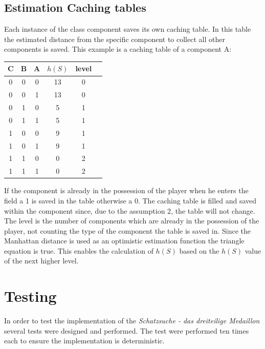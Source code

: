 \documentclass{article}
\newcommand{\problem}{Schatzsuche - das dreiteilige Medaillon}
\begin{document}
\subsection{Estimation Caching tables} \label{estimation_caching_tables}
Each instance of the class component saves its own caching table. In this table the estimated distance from the specific component to collect all other components is saved. This example is a caching table of a component A:\\
\begin{center}
\begin{tabular}{ |c|c|c|c|c|c| } 
 \hline
 C & B & A & $h(S)$ & level \\ 
 \hline
 0 & 0 & 0 & 13 & 0 \\ 
 0 & 0 & 1 & 13 & 0 \\ 
 0 & 1 & 0 & 5 & 1 \\ 
 0 & 1 & 1 & 5 & 1 \\ 
 1 & 0 & 0 & 9 & 1 \\ 
 1 & 0 & 1 & 9 & 1 \\ 
 1 & 1 & 0 & 0 & 2 \\ 
 1 & 1 & 1 & 0 & 2 \\ 
 \hline
\end{tabular}
\label{tab:caching table}
\end{center}
If the component is already in the possession of the player when he enters the field a 1 is saved in the table otherwise a 0. 
The caching table is filled and saved within the component since, due to the assumption 2, the table will not change. 
The level is the number of components which are already in the possession of the player, not counting the type of the component the table is saved in. 
Since the Manhattan distance is used as an optimistic estimation function the triangle equation is true. This enables the calculation of $h(S)$ based on the $h(S)$ value of the next higher level.


\section{Testing}
In order to test the implementation of the \textit{\problem} several tests were designed and performed. The test were performed ten times each to ensure the implementation is deterministic. 
\end{document}
